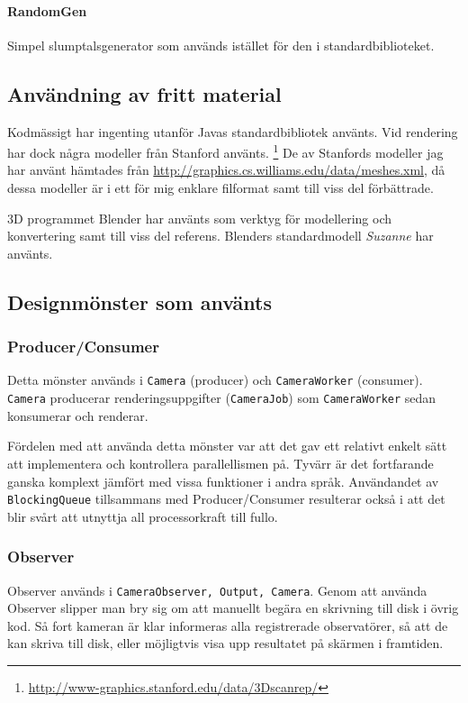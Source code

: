 \documentclass{article}
\begin{document}
\paragraph{RandomGen}
Simpel slumptalsgenerator som används istället för den i standardbiblioteket.

\subsection{Användning av fritt material}
Kodmässigt har ingenting utanför Javas standardbibliotek använts. Vid
rendering har dock några modeller från Stanford använts.
\footnote{\url{http://www-graphics.stanford.edu/data/3Dscanrep/}} De
av Stanfords modeller jag har använt hämtades från
\url{http://graphics.cs.williams.edu/data/meshes.xml}, då dessa
modeller är i ett för mig enklare filformat samt till viss del
förbättrade.

3D programmet Blender har använts som verktyg för modellering och
konvertering samt till viss del referens. Blenders standardmodell
\emph{Suzanne} har använts.

\subsection{Designmönster som använts}
\subsubsection{Producer/Consumer}
Detta mönster används i \texttt{Camera} (producer) och
\texttt{CameraWorker} (consumer). \texttt{Camera} producerar
renderingsuppgifter (\texttt{CameraJob}) som \texttt{CameraWorker}
sedan konsumerar och renderar.

Fördelen med att använda detta mönster var att det gav ett relativt
enkelt sätt att implementera och kontrollera parallellismen på. Tyvärr
är det fortfarande ganska komplext jämfört med vissa funktioner i
andra språk. Användandet av \texttt{BlockingQueue} tillsammans med
Producer/Consumer resulterar också i att det blir svårt att utnyttja
all processorkraft till fullo.

\subsubsection{Observer}
Observer används i \texttt{CameraObserver, Output, Camera}. Genom att
använda Observer slipper man bry sig om att manuellt begära en
skrivning till disk i övrig kod. Så fort kameran är klar informeras
alla registrerade observatörer, så att de kan skriva till disk, eller
möjligtvis visa upp resultatet på skärmen i framtiden.
\end{document}
